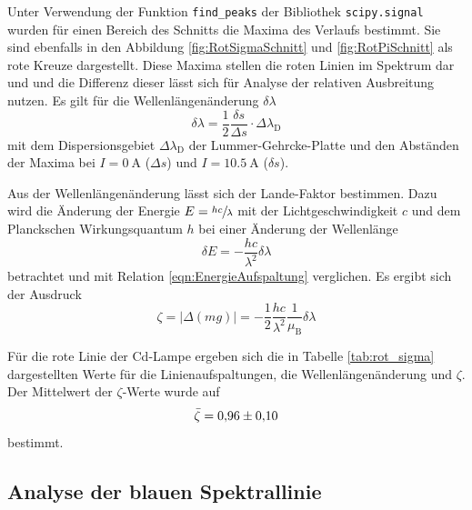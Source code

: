 Unter Verwendung der Funktion \texttt{find\_peaks} der Bibliothek \texttt{scipy.signal}
wurden für einen Bereich des Schnitts die Maxima des Verlaufs bestimmt.
Sie sind ebenfalls in den Abbildung \ref{fig:RotSigmaSchnitt} und \ref{fig:RotPiSchnitt}
als rote Kreuze dargestellt.
Diese Maxima stellen die roten Linien im Spektrum dar und und die Differenz dieser
lässt sich für Analyse der relativen Ausbreitung nutzen.
Es gilt für die Wellenlängenänderung $\delta\lambda$
\begin{equation}
  \delta\lambda = \frac{1}{2} \frac{\delta s}{\Delta s} \cdot \Delta \lambda_\text{D}
  \label{eqn:Wellenlaengenaenderung}
\end{equation}
mit dem Dispersionsgebiet $\Delta \lambda_\text{D}$ der Lummer-Gehrcke-Platte und
den Abständen der Maxima bei $I = \SI{0}{\ampere}$ ($\Delta s$) und
$I = \SI{10.5}{\ampere}$ ($\delta s$).

Aus der Wellenlängenänderung lässt sich der Lande-Faktor bestimmen.
Dazu wird die Änderung der Energie $E = \sfrac{h c}{\lambda}$ mit der
Lichtgeschwindigkeit $c$ und dem Planckschen Wirkungsquantum $h$
bei einer Änderung der Wellenlänge
\begin{equation}
  \delta E = - \frac{h c}{\lambda^2} \delta\lambda
\end{equation}
betrachtet und mit Relation \eqref{eqn:EnergieAufspaltung} verglichen.
Es ergibt sich der Ausdruck
\begin{equation}
  \zeta = \left|\Delta \left(m g\right)\right|
  = -\frac{1}{2} \frac{h c}{\lambda^2} \frac{1}{\mu_\text{B}} \delta\lambda
  \label{eqn:Auswerungsfunktion}
\end{equation}

Für die rote Linie der Cd-Lampe ergeben sich die in Tabelle \ref{tab:rot_sigma}
dargestellten Werte für die Linienaufspaltungen, die Wellenlängenänderung und
$\zeta$.
Der Mittelwert der $\zeta$-Werte wurde auf
\begin{equation*}
  \mean{\zeta} = \num{0.96(10)}
\end{equation*}
bestimmt.


\subsection{Analyse der blauen Spektrallinie}
\label{sec:AuswBlau}


